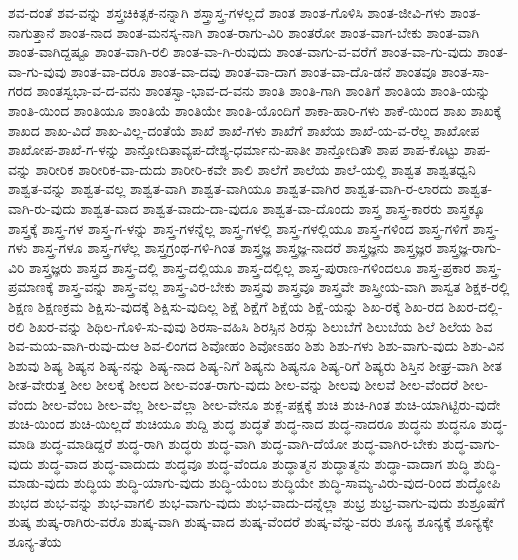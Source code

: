 {ಶವ-ದಂತೆ
ಶವ-ವನ್ನು
ಶಸ್ತ್ರಚಿಕಿತ್ಸಕ-ನನ್ನಾಗಿ
ಶಸ್ತ್ರಾಸ್ತ್ರ-ಗಳಲ್ಲದೆ
ಶಾಂತ
ಶಾಂತ-ಗೊಳಿಸಿ
ಶಾಂತ-ಜೀವಿ-ಗಳು
ಶಾಂತ-ನಾಗುತ್ತಾನೆ
ಶಾಂತ-ನಾದ
ಶಾಂತ-ಮನಸ್ಕ-ನಾಗಿ
ಶಾಂತ-ರಾಗು-ವಿರಿ
ಶಾಂತರೋ
ಶಾಂತ-ವಾಗ-ಬೇಕು
ಶಾಂತ-ವಾಗಿ
ಶಾಂತ-ವಾಗಿದ್ದಷ್ಟೂ
ಶಾಂತ-ವಾಗಿ-ರಲಿ
ಶಾಂತ-ವಾ-ಗಿ-ರುವುದು
ಶಾಂತ-ವಾಗು-ವ-ವರೆಗೆ
ಶಾಂತ-ವಾ-ಗು-ವುದು
ಶಾಂತ-ವಾ-ಗು-ವುವು
ಶಾಂತ-ವಾ-ದರೂ
ಶಾಂತ-ವಾ-ದವು
ಶಾಂತ-ವಾ-ದಾಗ
ಶಾಂತ-ವಾ-ದೊ-ಡನೆ
ಶಾಂತವೂ
ಶಾಂತ-ಸಾ-ಗರದ
ಶಾಂತಸ್ವಭಾ-ವ-ದ-ವನು
ಶಾಂತಸ್ವಾ-ಭಾವ-ದ-ವನು
ಶಾಂತಿ
ಶಾಂತಿ-ಗಾಗಿ
ಶಾಂತಿಗೆ
ಶಾಂತಿಯ
ಶಾಂತಿ-ಯನ್ನು
ಶಾಂತಿ-ಯಿಂದ
ಶಾಂತಿಯೂ
ಶಾಂತಿಯೆ
ಶಾಂತಿಯೇ
ಶಾಂತಿ-ಯೊಂದಿಗೆ
ಶಾಕಾ-ಹಾರಿ-ಗಳು
ಶಾಕೆ-ಯಿಂದ
ಶಾಖ
ಶಾಖಕ್ಕೆ
ಶಾಖದ
ಶಾಖ-ವಿದೆ
ಶಾಖ-ವಿಲ್ಲ-ದಂತೆಯೆ
ಶಾಖೆ
ಶಾಖೆ-ಗಳು
ಶಾಖೆಗೆ
ಶಾಖೆಯ
ಶಾಖೆ-ಯ-ವ-ರೆಲ್ಲ
ಶಾಖೋಪ
ಶಾಖೋಪ-ಶಾಖೆ-ಗ-ಳನ್ನು
ಶಾನ್ತೋದಿತಾವ್ಯಪ-ದೇಶ್ಯ-ಧರ್ಮಾನು-ಪಾತೀ
ಶಾನ್ತೋದಿತೌ
ಶಾಪ
ಶಾಪ-ಕೊಟ್ಟು
ಶಾಪ-ವನ್ನು
ಶಾರೀರಿಕ
ಶಾರೀರಿಕ-ವಾ-ದುದು
ಶಾರೀರಿ-ಕವೇ
ಶಾಲಿ
ಶಾಲೆಗೆ
ಶಾಲೆಯ
ಶಾಲೆ-ಯಲ್ಲಿ
ಶಾಶ್ವತ
ಶಾಶ್ವತಧ್ವನಿ
ಶಾಶ್ವತ-ವನ್ನು
ಶಾಶ್ವತ-ವಲ್ಲ
ಶಾಶ್ವತ-ವಾಗಿ
ಶಾಶ್ವತ-ವಾಗಿಯೂ
ಶಾಶ್ವತ-ವಾಗಿರ
ಶಾಶ್ವತ-ವಾಗಿ-ರ-ಲಾರದು
ಶಾಶ್ವತ-ವಾಗಿ-ರು-ವುದು
ಶಾಶ್ವತ-ವಾದ
ಶಾಶ್ವತ-ವಾದು-ದಾ-ವುದೂ
ಶಾಶ್ವತ-ವಾ-ದೊಂದು
ಶಾಸ್ತ್ರ
ಶಾಸ್ತ್ರ-ಕಾರರು
ಶಾಸ್ತ್ರಕ್ಕೂ
ಶಾಸ್ತ್ರಕ್ಕೆ
ಶಾಸ್ತ್ರ-ಗಳ
ಶಾಸ್ತ್ರ-ಗ-ಳನ್ನು
ಶಾಸ್ತ್ರ-ಗಳನ್ನೆಲ್ಲ
ಶಾಸ್ತ್ರ-ಗಳಲ್ಲಿ
ಶಾಸ್ತ್ರ-ಗಳಲ್ಲಿಯೂ
ಶಾಸ್ತ್ರ-ಗಳಿಂದ
ಶಾಸ್ತ್ರ-ಗಳಿಗೆ
ಶಾಸ್ತ್ರ-ಗಳು
ಶಾಸ್ತ್ರ-ಗಳೂ
ಶಾಸ್ತ್ರ-ಗಳೆಲ್ಲ
ಶಾಸ್ತ್ರಗ್ರಂಥ-ಗಳಿ-ಗಿಂತ
ಶಾಸ್ತ್ರಜ್ಞ
ಶಾಸ್ತ್ರಜ್ಞ-ನಾದರೆ
ಶಾಸ್ತ್ರಜ್ಞನು
ಶಾಸ್ತ್ರಜ್ಞರ
ಶಾಸ್ತ್ರಜ್ಞ-ರಾಗು-ವಿರಿ
ಶಾಸ್ತ್ರಜ್ಞರು
ಶಾಸ್ತ್ರದ
ಶಾಸ್ತ್ರ-ದಲ್ಲಿ
ಶಾಸ್ತ್ರ-ದಲ್ಲಿಯೂ
ಶಾಸ್ತ್ರ-ದಲ್ಲಿಲ್ಲ
ಶಾಸ್ತ್ರ-ಪುರಾಣ-ಗಳಿಂದಲೂ
ಶಾಸ್ತ್ರ-ಪ್ರಕಾರ
ಶಾಸ್ತ್ರ-ಪ್ರಮಾಣಕ್ಕೆ
ಶಾಸ್ತ್ರ-ವನ್ನು
ಶಾಸ್ತ್ರ-ವಲ್ಲ
ಶಾಸ್ತ್ರ-ವಿರ-ಬೇಕು
ಶಾಸ್ತ್ರವು
ಶಾಸ್ತ್ರವೂ
ಶಾಸ್ತ್ರವೇ
ಶಾಸ್ತ್ರೀಯ-ವಾಗಿ
ಶಾಸ್ವತ
ಶಿಕ್ಷಕ-ರಲ್ಲಿ
ಶಿಕ್ಷಣ
ಶಿಕ್ಷಣಕ್ರಮ
ಶಿಕ್ಷಿಸು-ವುದಕ್ಕೆ
ಶಿಕ್ಷಿಸು-ವುದಿಲ್ಲ
ಶಿಕ್ಷೆ
ಶಿಕ್ಷೆಗೆ
ಶಿಕ್ಷೆಯ
ಶಿಕ್ಷೆ-ಯನ್ನು
ಶಿಖ-ರಕ್ಕೆ
ಶಿಖ-ರದ
ಶಿಖರ-ದಲ್ಲಿ-ರಲಿ
ಶಿಖರ-ವನ್ನು
ಶಿಥಿಲ-ಗೊಳಿ-ಸು-ವುವು
ಶಿರಸಾ-ವಹಿಸಿ
ಶಿರಸ್ಸಿನ
ಶಿರಸ್ಸು
ಶಿಲುಬೆಗೆ
ಶಿಲುಬೆಯ
ಶಿಲೆ
ಶಿಲೆಯ
ಶಿವ
ಶಿವ-ಮಯ-ವಾಗಿ-ರುವು-ದುಆ
ಶಿವ-ಲಿಂಗದ
ಶಿವೋಹಂ
ಶಿವೋಽಹಂ
ಶಿಶು
ಶಿಶು-ಗಳು
ಶಿಶು-ವಾಗು-ವುದು
ಶಿಶು-ವಿನ
ಶಿಶುವು
ಶಿಷ್ಯ
ಶಿಷ್ಯನ
ಶಿಷ್ಯ-ನನ್ನು
ಶಿಷ್ಯ-ನಾದ
ಶಿಷ್ಯ-ನಿಗೆ
ಶಿಷ್ಯನು
ಶಿಷ್ಯನೂ
ಶಿಷ್ಯ-ರಿಗೆ
ಶಿಷ್ಯರು
ಶಿಸ್ತಿನ
ಶೀಘ್ರ-ವಾಗಿ
ಶೀತ
ಶೀತ-ವೇರುತ್ತ
ಶೀಲ
ಶೀಲಕ್ಕೆ
ಶೀಲದ
ಶೀಲ-ವಂತ-ರಾಗು-ವುದು
ಶೀಲ-ವನ್ನು
ಶೀಲವು
ಶೀಲವೆ
ಶೀಲ-ವೆಂದರೆ
ಶೀಲ-ವೆಂದು
ಶೀಲ-ವೆಂಬ
ಶೀಲ-ವೆಲ್ಲ
ಶೀಲ-ವೆಲ್ಲಾ
ಶೀಲ-ವೇನೂ
ಶುಕ್ಲ-ಪಕ್ಷಕ್ಕೆ
ಶುಚಿ
ಶುಚಿ-ಗಿಂತ
ಶುಚಿ-ಯಾಗಿಟ್ಟಿರು-ವುದೇ
ಶುಚಿ-ಯಿಂದ
ಶುಚಿ-ಯಿಲ್ಲದೆ
ಶುಚಿಯೂ
ಶುದ್ದಿ
ಶುದ್ಧ
ಶುದ್ಧತೆ
ಶುದ್ಧ-ನಾದ
ಶುದ್ಧ-ನಾದರೂ
ಶುದ್ಧನು
ಶುದ್ಧನೂ
ಶುದ್ಧ-ಮಾಡಿ
ಶುದ್ಧ-ಮಾಡಿದ್ದರೆ
ಶುದ್ಧ-ರಾಗಿ
ಶುದ್ಧರು
ಶುದ್ಧ-ವಾಗಿ
ಶುದ್ಧ-ವಾಗಿ-ದೆಯೋ
ಶುದ್ಧ-ವಾಗಿರ-ಬೇಕು
ಶುದ್ಧ-ವಾಗು-ವುದು
ಶುದ್ಧ-ವಾದ
ಶುದ್ಧ-ವಾದುದು
ಶುದ್ಧವೂ
ಶುದ್ಧ-ವೆಂದೂ
ಶುದ್ಧಾತ್ಮನ
ಶುದ್ಧಾತ್ಮನು
ಶುದ್ಧಾ-ವಾದಾಗ
ಶುದ್ಧಿ
ಶುದ್ಧಿ-ಮಾಡು-ವುದು
ಶುದ್ಧಿಯ
ಶುದ್ಧಿ-ಯಾಗು-ವುದು
ಶುದ್ಧಿ-ಯೆಂಬ
ಶುದ್ಧಿಯೇ
ಶುದ್ಧಿ-ಸಾಮ್ಯ-ವಿರು-ವುದ-ರಿಂದ
ಶುದ್ಧೋಪಿ
ಶುಭದ
ಶುಭ-ವನ್ನು
ಶುಭ-ವಾಗಲಿ
ಶುಭ-ವಾಗು-ವುದು
ಶುಭ-ವಾದು-ದನ್ನೆಲ್ಲಾ
ಶುಭ್ರ
ಶುಭ್ರ-ವಾಗು-ವುದು
ಶುಶ್ರೂಷೆಗೆ
ಶುಷ್ಕ
ಶುಷ್ಕ-ರಾಗಿರು-ವರೊ
ಶುಷ್ಕ-ವಾಗಿ
ಶುಷ್ಕ-ವಾದ
ಶುಷ್ಕ-ವೆಂದರೆ
ಶುಷ್ಕ-ವೆನ್ನು-ವರು
ಶೂನ್ಯ
ಶೂನ್ಯಕ್ಕೆ
ಶೂನ್ಯಕ್ಕೇ
ಶೂನ್ಯ-ತೆಯ
}
